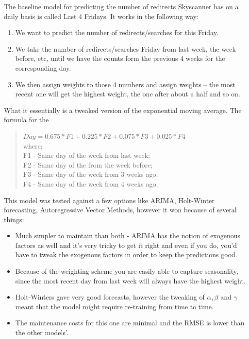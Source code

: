 \documentclass[minf,frontabs,twoside,singlespacing,parskip]{infthesis}
\begin{document}
The baseline model for predicting the number of redirects Skyscanner has on a daily basis is called Last 4 Fridays. 
It works in the following way:
\begin{enumerate}
\item We want to predict the number of redirects/searches for this Friday.
\item We take the number of redirects/searches Friday from last week, the week before, etc, until we have the counts form the previous 4 weeks for the corresponding day.
\item We then assign weights to those 4 numbers and assign weights -- the most recent one will get the highest weight, the one after about a half and so on.
\end{enumerate}

What it essentially is a tweaked version of the  exponential moving average. The formula for the 

\begin{quotation}
$Day=0.675*F1 + 0.225*F2 + 0.075*F3 + 0.025*F4$ \\
where: \\
F1 - Same day of the week from last week;\\
F2 - Same day of the from the week before;\\
F3 - Same day of the week from 3 weeks ago;\\
F4 - Same day of the week from 4 weeks ago;\\
\end{quotation}


This model was tested against a few options like ARIMA, Holt-Winter forecasting, Autoregressive Vector Methods, however it won because of several things:
\begin{itemize}
\item Much simpler to maintain than both - ARIMA has the notion of exogenous factors as well and it's very tricky to get it right and even if you do, you'd have to tweak the exogenous factors in order to keep the predictions good. 
\item Because of the weighting scheme you are easily able to capture seasonality, since the most recent day from last week will always have the highest weight.
\item Holt-Winters gave very good forecasts, however the tweaking of $\alpha, \beta$ and $\gamma$ meant that the model might require re-training from time to time. 
\item The maintenance costs for this one are minimal and the RMSE is lower than the other models'.
\end{itemize}
\end{document}

